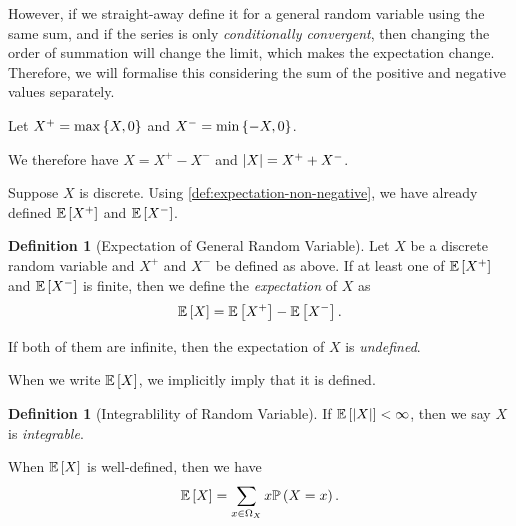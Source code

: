 \documentclass{article}
\theoremstyle{definition}
\newtheorem{definition}[theorem]{Definition}
\theoremstyle{remark}
\DeclarePairedDelimiter{\abs}{\lvert}{\rvert}
\newcommand{\Prob}{\mathbb{P}}
\newcommand{\Expt}{\mathbb{E}}
\begin{document}
However, if we straight-away define it for a general random variable using the same sum, and if the series is only \emph{conditionally convergent}, then changing the order of summation will change the limit, which makes the expectation change. Therefore, we will formalise this considering the sum of the positive and negative values separately.

Let \(X^+ = \max\left\{X, 0\right\}\) and \(X^- = \min\left\{-X, 0\right\}\).

We therefore have \(X = X^+ - X^-\) and \(\abs{X} = X^+ + X^-\).

Suppose \(X\) is discrete. Using \autoref{def:expectation-non-negative}, we have already defined \(\Expt\bqty{X^+}\) and \(\Expt\bqty{X^-}\).

\begin{definition}[Expectation of General Random Variable]
    \label{def:expectation-general-random-variable}%
    Let \(X\) be a discrete random variable and \(X^+\) and \(X^-\) be defined as above. If at least one of \(\Expt\bqty{X^+}\) and \(\Expt\bqty{X^-}\) is finite, then we define the \emph{expectation} of \(X\) as
    \[
        \Expt\bqty{X} = \Expt\bqty{X^+} - \Expt\bqty{X^-}.
    \]

    If both of them are infinite, then the expectation of \(X\) is \emph{undefined}.
\end{definition}

When we write \(\Expt\bqty{X}\), we implicitly imply that it is defined.

\begin{definition}[Integrablility of Random Variable]
    \label{def:integrability-random-variable}%
    If \(\Expt\bqty{\abs{X}} < \infty\), then we say \(X\) is \emph{integrable}.
\end{definition}

When \(\Expt\bqty{X}\) is well-defined, then we have
\[
    \Expt\bqty{X} = \sum_{x \in \Omega_X} x \Prob\pqty{X = x}.
\]
\end{document}
